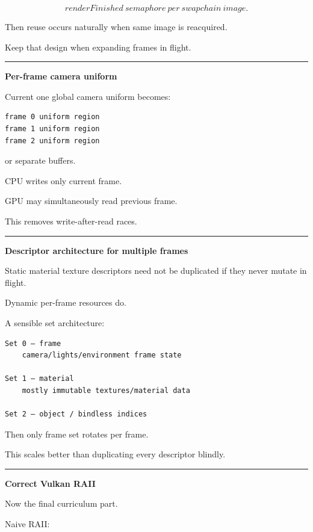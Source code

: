 \[
\boxed{
renderFinished\ semaphore\ per\ swapchain\ image.
}
\]

Then reuse occurs naturally when same image is reacquired.

Keep that design when expanding frames in flight.

\begin{center}\rule{0.5\linewidth}{0.5pt}\end{center}

\textbf{Per-frame camera uniform}

Current one global camera uniform becomes:

\begin{verbatim}
frame 0 uniform region
frame 1 uniform region
frame 2 uniform region
\end{verbatim}

or separate buffers.

CPU writes only current frame.

GPU may simultaneously read previous frame.

This removes write-after-read races.

\begin{center}\rule{0.5\linewidth}{0.5pt}\end{center}

\textbf{Descriptor architecture for multiple frames}

Static material texture descriptors need not be duplicated if they never mutate in flight.

Dynamic per-frame resources do.

A sensible set architecture:

\begin{verbatim}
Set 0 — frame
    camera/lights/environment frame state

Set 1 — material
    mostly immutable textures/material data

Set 2 — object / bindless indices
\end{verbatim}

Then only frame set rotates per frame.

This scales better than duplicating every descriptor blindly.

\begin{center}\rule{0.5\linewidth}{0.5pt}\end{center}

\textbf{Correct Vulkan RAII}

Now the final curriculum part.

Naive RAII:

